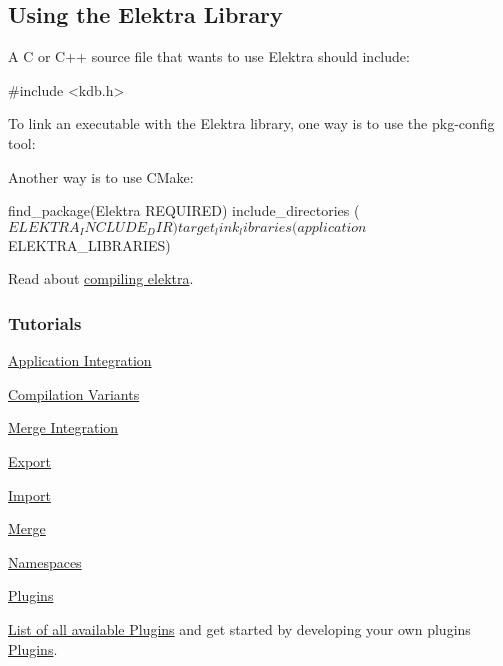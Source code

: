 \subsection*{Using the Elektra Library}

A C or C++ source file that wants to use Elektra should include\+: \begin{DoxyVerb}#include <kdb.h>
\end{DoxyVerb}


To link an executable with the Elektra library, one way is to use the {\ttfamily pkg-\/config} tool\+: 


Another way is to use C\+Make\+: \begin{DoxyVerb}find_package(Elektra REQUIRED)
include_directories (${ELEKTRA_INCLUDE_DIR})
target_link_libraries (application ${ELEKTRA_LIBRARIES})
\end{DoxyVerb}


Read about \hyperlink{doc_COMPILE_md}{compiling elektra}.

\subsubsection*{Tutorials}


\begin{DoxyItemize}
\item \hyperlink{doc_tutorials_application-integration_md}{Application Integration}
\item \hyperlink{doc_tutorials_compilation-variants_md}{Compilation Variants}
\item \hyperlink{doc_tutorials_elektra-merge-integration_md}{Merge Integration}
\item \hyperlink{doc_tutorials_export_md}{Export}
\item \hyperlink{doc_tutorials_import_md}{Import}
\item \hyperlink{doc_tutorials_merge_md}{Merge}
\item \hyperlink{doc_tutorials_namespaces_md}{Namespaces}
\item \hyperlink{doc_tutorials_plugins_md}{Plugins}
\end{DoxyItemize}

\hyperlink{src_plugins_README_md}{List of all available Plugins} and get started by developing your own plugins \hyperlink{group__plugin}{Plugins}.

